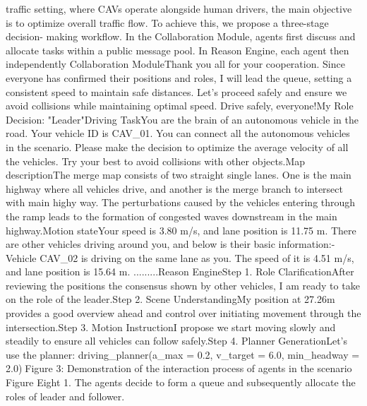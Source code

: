 \documentclass[12pt]{article}
\begin{document}
traffic setting, where CAVs operate alongside human
drivers, the main objective is to optimize overall traffic
flow. To achieve this, we propose a three-stage decision-
making workflow. In the Collaboration Module, agents
first discuss and allocate tasks within a public message
pool. In Reason Engine, each agent then independently
Collaboration ModuleThank you all for your cooperation. Since everyone has confirmed their positions and roles, I will lead the queue, setting a consistent speed to maintain safe distances. Let's proceed safely and ensure we avoid collisions while maintaining optimal speed. Drive safely, everyone!My Role Decision: "Leader"Driving TaskYou are the brain of an autonomous vehicle in the road. Your vehicle ID is CAV_01. You can connect all the autonomous vehicles in the scenario. Please make the decision to optimize the average velocity of all the vehicles. Try your best to avoid collisions with other objects.Map descriptionThe merge map consists of two straight single lanes. One is the main highway where all vehicles drive, and another is the merge branch to intersect with main highy way. The perturbations caused by the vehicles entering through the ramp leads to the formation of congested waves downstream in the main highway.Motion stateYour speed is 3.80 m/s, and lane position is 11.75 m. There are other vehicles driving around you, and below is their basic information:- Vehicle CAV_02 is driving on the same lane as you. The speed of it is 4.51 m/s, and lane position is 15.64 m. .........Reason EngineStep 1. Role ClarificationAfter reviewing the positions the consensus shown by other vehicles, I am ready to take on the role of the leader.Step 2. Scene UnderstandingMy position at 27.26m provides a good overview ahead and control over initiating movement through the intersection.Step 3. Motion InstructionI propose we start moving slowly and steadily to ensure all vehicles can follow safely.Step 4. Planner GenerationLet’s use the planner: driving_planner(a_max = 0.2, v_target = 6.0, min_headway = 2.0)Figure 3: Demonstration of the interaction process of agents in the scenario Figure Eight 1. The agents decide
to form a queue and subsequently allocate the roles of leader and follower.
\end{document}
